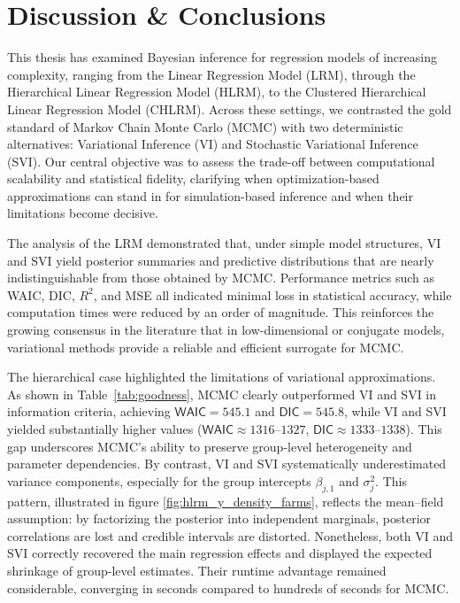 \chapter{Discussion \& Conclusions}

This thesis has examined Bayesian inference for regression models of increasing complexity, ranging from the Linear Regression Model (LRM), through the Hierarchical Linear Regression Model (HLRM), to the Clustered Hierarchical Linear Regression Model (CHLRM). Across these settings, we contrasted the gold standard of Markov Chain Monte Carlo (MCMC) with two deterministic alternatives: Variational Inference (VI) and Stochastic Variational Inference (SVI). Our central objective was to assess the trade-off between computational scalability and statistical fidelity, clarifying when optimization-based approximations can stand in for simulation-based inference and when their limitations become decisive.

\vspace{0.3cm}

The analysis of the LRM demonstrated that, under simple model structures, VI and SVI yield posterior summaries and predictive distributions that are nearly indistinguishable from those obtained by MCMC. Performance metrics such as WAIC, DIC, $R^2$, and MSE all indicated minimal loss in statistical accuracy, while computation times were reduced by an order of magnitude. This reinforces the growing consensus in the literature \cite{Ormerod2010-bc, Blei2016VariationalIA, zhang2018advancesvariationalinference} that in low-dimensional or conjugate models, variational methods provide a reliable and efficient surrogate for MCMC.

\vspace{0.3cm}

The hierarchical case highlighted the limitations of variational approximations. As shown in Table~\ref{tab:goodness}, MCMC clearly outperformed VI and SVI in information criteria, achieving $\mathsf{WAIC}=545.1$ and $\mathsf{DIC}=545.8$, while VI and SVI yielded substantially higher values ($\mathsf{WAIC}\approx 1316$--$1327$, $\mathsf{DIC}\approx 1333$--$1338$). This gap underscores MCMC’s ability to preserve group-level heterogeneity and parameter dependencies. By contrast, VI and SVI systematically underestimated variance components, especially for the group intercepts $\beta_{j,1}$ and $\sigma_j^2$. This pattern, illustrated in figure \ref{fig:hlrm_y_density_farms}, reflects the mean–field assumption: by factorizing the posterior into independent marginals, posterior correlations are lost and credible intervals are distorted. Nonetheless, both VI and SVI correctly recovered the main regression effects and displayed the expected shrinkage of group-level estimates. Their runtime advantage remained considerable, converging in seconds compared to hundreds of seconds for MCMC.

